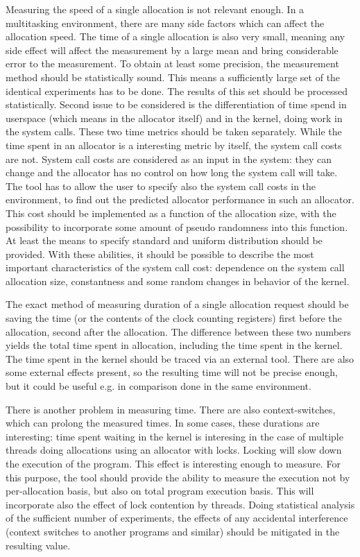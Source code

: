 Measuring the speed of a single allocation is not relevant enough. In a multitasking environment, there are many side factors which can affect the allocation speed. The time of a single allocation is also very small, meaning any side effect will affect the measurement by a large mean and bring considerable error to the measurement. To obtain at least some precision, the measurement method should be statistically sound. This means a sufficiently large set of the identical experiments has to be done. The results of this set should be processed statistically. Second issue to be considered is the differentiation of time spend in userspace (which means in the allocator itself) and in the kernel, doing work in the system calls. These two time metrics should be taken separately. While the time spent in an allocator is a interesting metric by itself, the system call costs are not. System call costs are considered as an input in the system: they can change and the allocator has no control on how long the system call will take. The tool has to allow the user to specify also the system call costs in the environment, to find out the predicted allocator performance in such an allocator. This cost should be implemented as a function of the allocation size, with the possibility to incorporate some amount of pseudo randomness into this function. At least the means to specify standard and uniform distribution should be provided. With these abilities, it should be possible to describe the most important characteristics of the system call cost: dependence on the system call allocation size, constantness and some random changes in behavior of the kernel.

The exact method of measuring duration of a single allocation request should be saving the time (or the contents of the clock counting registers) first before the allocation, second after the allocation. The difference between these two numbers yields the total time spent in allocation, including the time spent in the kernel. The time spent in the kernel should be traced via an external tool. There are also some external effects present, so the resulting time will not be precise enough, but it could be useful e.g. in comparison done in the same environment.

There is another problem in measuring time. There are also context-switches, which can prolong the measured times. In some cases, these durations are interesting: time spent waiting in the kernel is interesing in the case of multiple threads doing allocations using an allocator with locks. Locking will slow down the execution of the program. This effect is interesting enough to measure. For this purpose, the tool should provide the ability to measure the execution not by per-allocation basis, but also on total program execution basis. This will incorporate also the effect of lock contention by threads. Doing statistical analysis of the sufficient number of experiments, the effects of any accidental interference (context switches to another programs and similar) should be mitigated in the resulting value.

